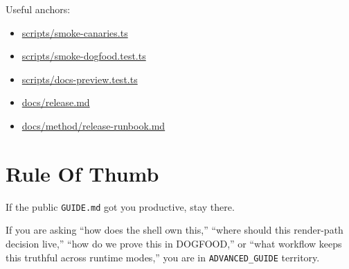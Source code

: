 Useful anchors:

\begin{itemize}
\tightlist
\item
  \href{https://github.com/flyingrobots/bijou/blob/cbd70612140e7a450d764b3c7be1c6af878b99bc/scripts/smoke-canaries.ts}{scripts/smoke-canaries.ts}
\item
  \href{https://github.com/flyingrobots/bijou/blob/cbd70612140e7a450d764b3c7be1c6af878b99bc/scripts/smoke-dogfood.test.ts}{scripts/smoke-dogfood.test.ts}
\item
  \href{https://github.com/flyingrobots/bijou/blob/cbd70612140e7a450d764b3c7be1c6af878b99bc/scripts/docs-preview.test.ts}{scripts/docs-preview.test.ts}
\item
  \href{https://github.com/flyingrobots/bijou/blob/cbd70612140e7a450d764b3c7be1c6af878b99bc/docs/release.md}{docs/release.md}
\item
  \href{https://github.com/flyingrobots/bijou/blob/1853ad902f6bf219326409e7f743a5a1d6517dbc/docs/method/release-runbook.md}{docs/method/release-runbook.md}
\end{itemize}

\section{Rule Of Thumb}\label{record-001-rule-of-thumb}

If the public \texttt{G\allowbreak{}U\allowbreak{}I\allowbreak{}D\allowbreak{}E\allowbreak{}.\allowbreak{}m\allowbreak{}d} got you productive, stay there.

If you are asking ``how does the shell own this,'' ``where should this render-path decision live,'' ``how do we prove this in DOGFOOD,'' or ``what workflow keeps this truthful across runtime modes,'' you are in \texttt{A\allowbreak{}D\allowbreak{}V\allowbreak{}A\allowbreak{}N\allowbreak{}C\allowbreak{}E\allowbreak{}D\allowbreak{}\_\allowbreak{}G\allowbreak{}U\allowbreak{}I\allowbreak{}D\allowbreak{}E} territory.

